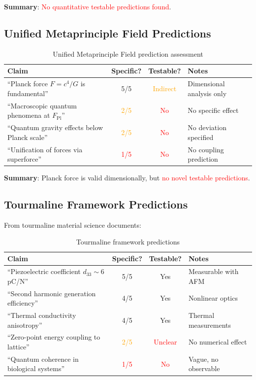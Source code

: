 \textbf{Summary}: \textcolor{red}{No quantitative testable predictions found}.

\subsection{Unified Metaprinciple Field Predictions}

\begin{table}[H]
\centering
\footnotesize
\begin{tabular}{p{5cm}ccp{3cm}}
\toprule
\textbf{Claim} & \textbf{Specific?} & \textbf{Testable?} & \textbf{Notes} \\
\midrule
``Planck force $F = c^4/G$ is fundamental'' & \textcolor{validcolor}{5/5} & \textcolor{orange}{Indirect} & Dimensional analysis only \\
``Macroscopic quantum phenomena at $F_{\text{Pl}}$'' & \textcolor{orange}{2/5} & \textcolor{red}{No} & No specific effect \\
``Quantum gravity effects below Planck scale'' & \textcolor{orange}{2/5} & \textcolor{red}{No} & No deviation specified \\
``Unification of forces via superforce'' & \textcolor{red}{1/5} & \textcolor{red}{No} & No coupling prediction \\
\bottomrule
\end{tabular}
\caption{Unified Metaprinciple Field prediction assessment}
\end{table}

\textbf{Summary}: Planck force is valid dimensionally, but \textcolor{red}{no novel testable predictions}.

\subsection{Tourmaline Framework Predictions}

From tourmaline material science documents:

\begin{table}[H]
\centering
\footnotesize
\begin{tabular}{p{5cm}ccp{3cm}}
\toprule
\textbf{Claim} & \textbf{Specific?} & \textbf{Testable?} & \textbf{Notes} \\
\midrule
``Piezoelectric coefficient $d_{33} \sim 6$ pC/N'' & \textcolor{validcolor}{5/5} & \textcolor{validcolor}{Yes} & Measurable with AFM \\
``Second harmonic generation efficiency'' & \textcolor{validcolor}{4/5} & \textcolor{validcolor}{Yes} & Nonlinear optics \\
``Thermal conductivity anisotropy'' & \textcolor{validcolor}{4/5} & \textcolor{validcolor}{Yes} & Thermal measurements \\
``Zero-point energy coupling to lattice'' & \textcolor{orange}{2/5} & \textcolor{red}{Unclear} & No numerical effect \\
``Quantum coherence in biological systems'' & \textcolor{red}{1/5} & \textcolor{red}{No} & Vague, no observable \\
\bottomrule
\end{tabular}
\caption{Tourmaline framework predictions}
\end{table}


